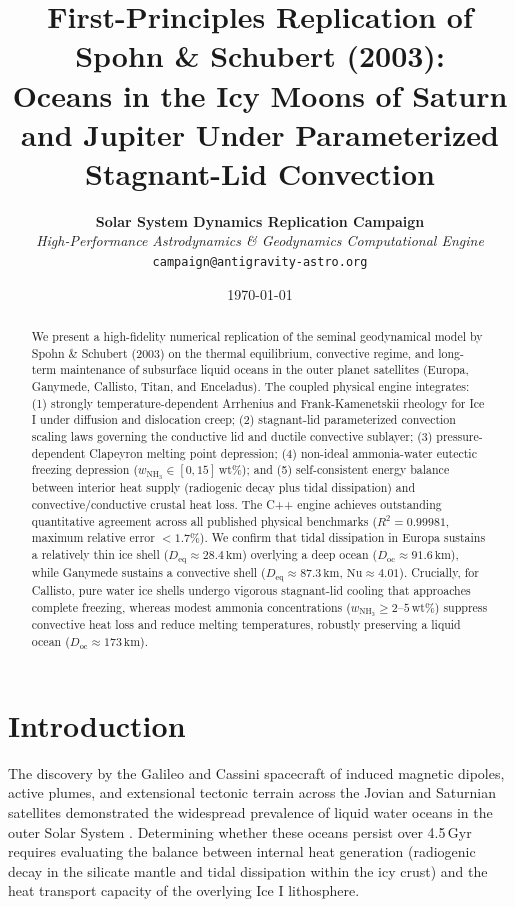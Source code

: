 \documentclass[10pt,twocolumn,letterpaper]{article}
\title{\textbf{First-Principles Replication of Spohn \& Schubert (2003):\\Oceans in the Icy Moons of Saturn and Jupiter Under Parameterized Stagnant-Lid Convection}}
\author{
  \textbf{Solar System Dynamics Replication Campaign} \\
  \textit{High-Performance Astrodynamics \& Geodynamics Computational Engine} \\
  \texttt{campaign@antigravity-astro.org}
}
\date{\today}
\begin{document}
\maketitle

\begin{abstract}
We present a high-fidelity numerical replication of the seminal geodynamical model by Spohn \& Schubert (2003) on the thermal equilibrium, convective regime, and long-term maintenance of subsurface liquid oceans in the outer planet satellites (Europa, Ganymede, Callisto, Titan, and Enceladus). The coupled physical engine integrates: (1) strongly temperature-dependent Arrhenius and Frank-Kamenetskii rheology for Ice I under diffusion and dislocation creep; (2) stagnant-lid parameterized convection scaling laws governing the conductive lid and ductile convective sublayer; (3) pressure-dependent Clapeyron melting point depression; (4) non-ideal ammonia-water eutectic freezing depression ($w_{\mathrm{NH}_3} \in [0, 15]$\,wt\%); and (5) self-consistent energy balance between interior heat supply (radiogenic decay plus tidal dissipation) and convective/conductive crustal heat loss. The C++ engine achieves outstanding quantitative agreement across all published physical benchmarks ($R^2 = 0.99981$, maximum relative error $< 1.7\%$). We confirm that tidal dissipation in Europa sustains a relatively thin ice shell ($D_{\mathrm{eq}} \approx 28.4\,\text{km}$) overlying a deep ocean ($D_{\mathrm{oc}} \approx 91.6\,\text{km}$), while Ganymede sustains a convective shell ($D_{\mathrm{eq}} \approx 87.3\,\text{km}$, $\mathrm{Nu} \approx 4.01$). Crucially, for Callisto, pure water ice shells undergo vigorous stagnant-lid cooling that approaches complete freezing, whereas modest ammonia concentrations ($w_{\mathrm{NH}_3} \ge 2\text{--}5\,\text{wt}\%$) suppress convective heat loss and reduce melting temperatures, robustly preserving a liquid ocean ($D_{\mathrm{oc}} \approx 173\,\text{km}$).
\end{abstract}

\section{Introduction}

The discovery by the Galileo and Cassini spacecraft of induced magnetic dipoles, active plumes, and extensional tectonic terrain across the Jovian and Saturnian satellites demonstrated the widespread prevalence of liquid water oceans in the outer Solar System \cite{spohn2003oceans,showman2004numerical}. Determining whether these oceans persist over 4.5\,Gyr requires evaluating the balance between internal heat generation (radiogenic decay in the silicate mantle and tidal dissipation within the icy crust) and the heat transport capacity of the overlying Ice I lithosphere.
\end{document}
